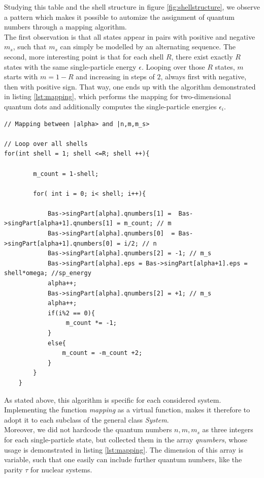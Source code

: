 Studying this table and the shell structure in figure \ref{fig:shellstructure}, we observe a pattern which makes it possible to automize the assignment of quantum numbers through a mapping algorithm.\\
The first observation is that all states appear in pairs with positive and negative $m_s$, such that $m_s$ can simply be modelled by an alternating sequence. The second, more interesting point is that for each shell $R$, there exist exactly $R$ states with the same single-particle energy $\epsilon$. Looping over those $R$ states, $m$ starts with $m = 1-R$ and increasing in steps of $2$, always first with negative, then with positive sign.
That way, one ends up with the algorithm demonstrated in listing \ref{lst:mapping}, which performs the mapping for two-dimensional quantum dots and additionally computes the single-particle energies $\epsilon_i$.

\begin{lstlisting}[float,caption= {Algorithm performing the mapping $\left| \alpha \right\rangle \rightarrow \left| n,m,m_s \right\rangle$. The array \textit{qnumbers} contains the quantum numbers in the order $n,m,m_s$. Line 12, for example, then means that we access $m_s$ of the single particle state $\alpha$, contained in the Basis \textbf{Bas}.}, label=lst:mapping]
// Mapping between |alpha> and |n,m,m_s>

// Loop over all shells
for(int shell = 1; shell <=R; shell ++){
        
        m_count = 1-shell;
        
        for( int i = 0; i< shell; i++){
            
            Bas->singPart[alpha].qnumbers[1] =  Bas->singPart[alpha+1].qnumbers[1] = m_count; // m
            Bas->singPart[alpha].qnumbers[0]  = Bas->singPart[alpha+1].qnumbers[0] = i/2; // n
            Bas->singPart[alpha].qnumbers[2] = -1; // m_s
            Bas->singPart[alpha].eps = Bas->singPart[alpha+1].eps = shell*omega; //sp_energy
            alpha++;
            Bas->singPart[alpha].qnumbers[2] = +1; // m_s
            alpha++;
            if(i%2 == 0){
                 m_count *= -1; 
            }   
            else{
                m_count = -m_count +2; 
            }
        }       
    }
\end{lstlisting}

As stated above, this algorithm is specific for each considered system. Implementing the function \textit{mapping} as a virtual function, makes it therefore  to adopt it to each subclass of the general class \textit{System}.\\
Moreover, we did not hardcode the quantum numbers $n,m,m_s$ as three integers for each single-particle state, but collected them in the array \textit{qnumbers}, whose usage is demonstrated in listing \ref{lst:mapping}. The dimension of this array is variable, such that one easily can include further quantum numbers, like the parity $\tau$ for nuclear systems.

